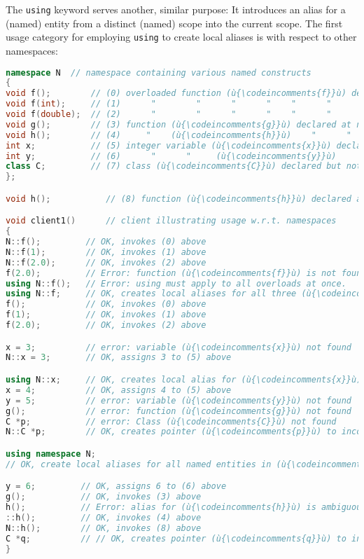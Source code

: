 The \texttt{using} keyword serves another, similar purpose: It introduces an
alias for a (named) entity from a distinct (named) scope into the
current scope. The first usage category for employing \texttt{using} to
create local aliases is with respect to other namespaces:

\begin{lstlisting}[language=C++]
namespace N  // namespace containing various named constructs
{
void f();        // (0) overloaded function (ù{\codeincomments{f}}ù) declared at namespace scope
void f(int);     // (1)      "        "      "      "    "      "       "
void f(double);  // (2)      "        "      "      "    "      "       "
void g();        // (3) function (ù{\codeincomments{g}}ù) declared at namespace scope
void h();        // (4)     "    (ù{\codeincomments{h}}ù)    "      "     "       "
int x;           // (5) integer variable (ù{\codeincomments{x}}ù) declared at namespace scope
int y;           // (6)      "      "     (ù{\codeincomments{y}}ù)     "     "     "      "
class C;         // (7) class (ù{\codeincomments{C}}ù) declared but not defined at namespace scope
};

void h();           // (8) function (ù{\codeincomments{h}}ù) declared at file (aka global) scope

void client1()      // client illustrating usage w.r.t. namespaces
{
N::f();         // OK, invokes (0) above
N::f(1);        // OK, invokes (1) above
N::f(2.0);      // OK, invokes (2) above
f(2.0);         // Error: function (ù{\codeincomments{f}}ù) is not found.
using N::f();   // Error: using must apply to all overloads at once.
using N::f;     // OK, creates local aliases for all three (ù{\codeincomments{f}}ù) overloads
f();            // OK, invokes (0) above
f(1);           // OK, invokes (1) above
f(2.0);         // OK, invokes (2) above

x = 3;          // error: variable (ù{\codeincomments{x}}ù) not found
N::x = 3;       // OK, assigns 3 to (5) above

using N::x;     // OK, creates local alias for (ù{\codeincomments{x}}ù)
x = 4;          // OK, assigns 4 to (5) above
y = 5;          // error: variable (ù{\codeincomments{y}}ù) not found
g();            // error: function (ù{\codeincomments{g}}ù) not found
C *p;           // error: Class (ù{\codeincomments{C}}ù) not found
N::C *p;        // OK, creates pointer (ù{\codeincomments{p}}ù) to incomplete type (ù{\codeincomments{C}}ù) (8) above

using namespace N;
// OK, create local aliases for all named entities in (ù{\codeincomments{namespace}}ù) (ù{\codeincomments{N}}ù).

y = 6;         // OK, assigns 6 to (6) above
g();           // OK, invokes (3) above
h();           // Error: alias for (ù{\codeincomments{h}}ù) is ambiguous; (4) or (8) above.
::h();         // OK, invokes (4) above
N::h();        // OK, invokes (8) above
C *q;          // // OK, creates pointer (ù{\codeincomments{q}}ù) to incomplete type (ù{\codeincomments{C}}ù) (8) above
}
\end{lstlisting}


